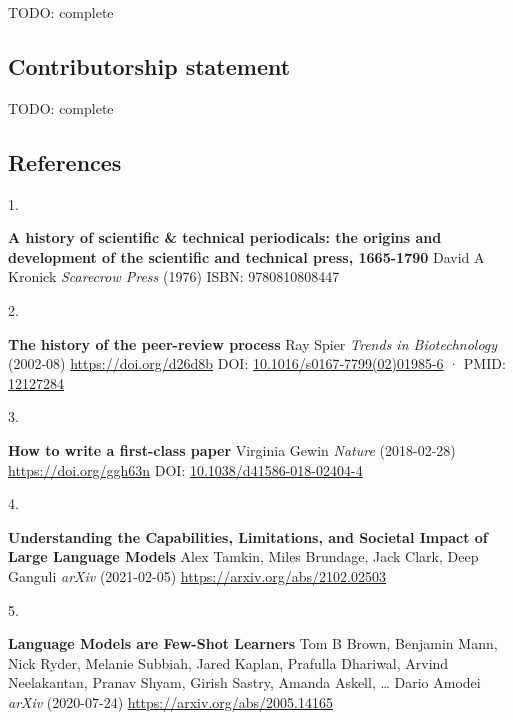 \documentclass[
]{article}
\newlength{\cslhangindent}
\newlength{\csllabelwidth}
\newlength{\cslentryspacingunit} %
\newenvironment{CSLReferences}[2] %
 {%
  \setlength{\parindent}{0pt}
  \ifodd #1
  \let\oldpar\par
  \def\par{\hangindent=\cslhangindent\oldpar}
  \fi
  \setlength{\parskip}{#2\cslentryspacingunit}
 }%
 {}
\newcommand{\CSLBlock}[1]{#1\hfill\break}
\newcommand{\CSLLeftMargin}[1]{\parbox[t]{\csllabelwidth}{#1}}
\newcommand{\CSLRightInline}[1]{\parbox[t]{\linewidth - \csllabelwidth}{#1}\break}
\begin{document}
TODO: complete

\hypertarget{contributorship-statement}{%
\subsection{Contributorship statement}\label{contributorship-statement}}

TODO: complete

\hypertarget{references}{%
\subsection{References}\label{references}}

\hypertarget{refs}{}
\begin{CSLReferences}{0}{0}
\leavevmode{}%
\CSLLeftMargin{1. }%
\CSLRightInline{\textbf{A history of scientific \& technical periodicals: the origins and development of the scientific and technical press, 1665-1790}
\CSLBlock{David A Kronick} \emph{Scarecrow Press} (1976)
\CSLBlock{ISBN: 9780810808447}}

\leavevmode{}%
\CSLLeftMargin{2. }%
\CSLRightInline{\textbf{The history of the peer-review process}
\CSLBlock{Ray Spier} \emph{Trends in Biotechnology} (2002-08) \url{https://doi.org/d26d8b}
\CSLBlock{DOI: \href{https://doi.org/10.1016/s0167-7799(02)01985-6}{10.1016/s0167-7799(02)01985-6} · PMID: \href{https://www.ncbi.nlm.nih.gov/pubmed/12127284}{12127284}}}

\leavevmode{}%
\CSLLeftMargin{3. }%
\CSLRightInline{\textbf{How to write a first-class paper}
\CSLBlock{Virginia Gewin} \emph{Nature} (2018-02-28) \url{https://doi.org/ggh63n}
\CSLBlock{DOI: \href{https://doi.org/10.1038/d41586-018-02404-4}{10.1038/d41586-018-02404-4}}}

\leavevmode{}%
\CSLLeftMargin{4. }%
\CSLRightInline{\textbf{Understanding the Capabilities, Limitations, and Societal Impact of Large Language Models}
\CSLBlock{Alex Tamkin, Miles Brundage, Jack Clark, Deep Ganguli} \emph{arXiv} (2021-02-05) \url{https://arxiv.org/abs/2102.02503}}

\leavevmode{}%
\CSLLeftMargin{5. }%
\CSLRightInline{\textbf{Language Models are Few-Shot Learners}
\CSLBlock{Tom B Brown, Benjamin Mann, Nick Ryder, Melanie Subbiah, Jared Kaplan, Prafulla Dhariwal, Arvind Neelakantan, Pranav Shyam, Girish Sastry, Amanda Askell, \ldots{} Dario Amodei} \emph{arXiv} (2020-07-24) \url{https://arxiv.org/abs/2005.14165}}


\end{CSLReferences}
\end{document}
